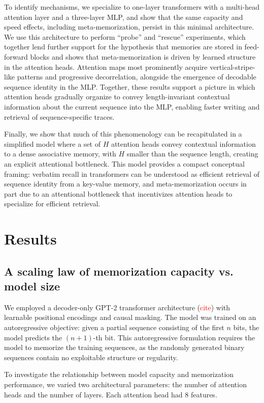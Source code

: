\documentclass{article}
\theoremstyle{plain}
\theoremstyle{definition}
\theoremstyle{remark}
\begin{document}
To identify mechanisms, we specialize to one-layer transformers with a multi-head attention layer and a three-layer MLP, and show that the same capacity and speed effects, including meta-memorization, persist in this minimal architecture. We use this architecture to perform ``probe'' and ``rescue'' experiments, which together lend further support for the hypothesis that memories are stored in feed-forward blocks and shows that meta-memorization is driven by learned structure in the attention heads. Attention maps most prominently acquire vertical-stripe-like patterns and progressive decorrelation, alongside the emergence of decodable sequence identity in the MLP. Together, these results support a picture in which attention heads gradually organize to convey length-invariant contextual information about the current sequence into the MLP, enabling faster writing and retrieval of sequence-specific traces.

Finally, we show that much of this phenomenology can be recapitulated in a simplified model where a set of $H$ attention heads convey contextual information to a dense associative memory, with $H$ smaller than the sequence length, creating an explicit attentional bottleneck. This model provides a compact conceptual framing: verbatim recall in transformers can be understood as efficient retrieval of sequence identity from a key-value memory, and meta-memorization occurs in part due to an attentional bottleneck that incentivizes attention heads to specialize for efficient retrieval. 


\section{Results}
\label{sec:results}

\subsection{A scaling law of memorization capacity vs. model size}
We employed a decoder-only GPT-2 transformer architecture (\textcolor{red}{cite}) with
 learnable positional encodings and causal masking. 
 The model was trained on an autoregressive objective: given a partial sequence consisting of the first $n$ bits,
  the model predicts the $(n+1)$-th bit. 
  This autoregressive formulation requires the model to memorize the training sequences, 
  as the randomly generated binary sequences contain no exploitable structure or regularity.

To investigate the relationship between model capacity and memorization performance,
 we varied two architectural parameters: the number of attention heads and the number of layers.
  Each attention head had 8 features. 
\end{document}
